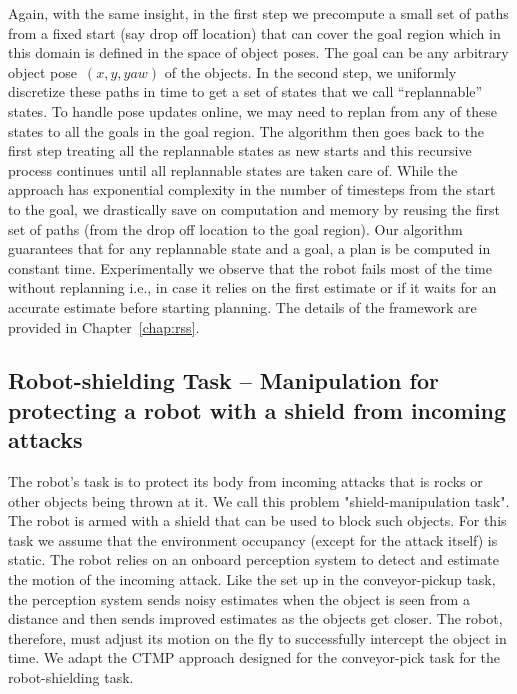 \documentclass[a4paper]{report}
\begin{document}
Again, with the same insight, in the first step we precompute a small set of paths from a fixed start (say drop off location) that can cover the goal region which in this domain is defined in the space of object poses. The goal can be any arbitrary object pose~$(x,y,yaw)$ of the objects. In the second step, we uniformly discretize these paths in time to get a set of states that we call ``replannable'' states. To handle pose updates online, we may need to replan from any of these states to all the goals in the goal region. The algorithm then goes back to the first step treating all the replannable states as new starts and this recursive process continues until all replannable states are taken care of. While the approach has exponential complexity in the number of timesteps from the start to the goal, we drastically save on computation and memory by reusing the first set of paths (from the drop off location to the goal region). Our algorithm guarantees that for any replannable state and a goal, a plan is be computed in constant time. Experimentally we observe that the robot fails most of the time without replanning i.e., in case it relies on the first estimate or if it waits for an accurate estimate before starting planning. The details of the framework are provided in Chapter~\ref{chap:rss}.

\subsection*{Robot-shielding Task -- Manipulation for protecting a robot with a shield from incoming attacks}
The robot's task is to protect its body from incoming attacks that is rocks or other objects being thrown at it. We call this problem "shield-manipulation task". The robot is armed with a shield that can be used to block such objects. For this task we assume that the environment occupancy (except for the attack itself) is static.
The robot relies on an onboard perception system to detect and estimate the motion of the incoming attack. Like the set up in the conveyor-pickup task, the perception system sends noisy estimates when the object is seen from a distance and then sends improved estimates as the objects get closer. The robot, therefore, must adjust its motion on the fly to successfully intercept the object in time. We adapt the CTMP approach designed for the conveyor-pick task for the robot-shielding task.
\end{document}
